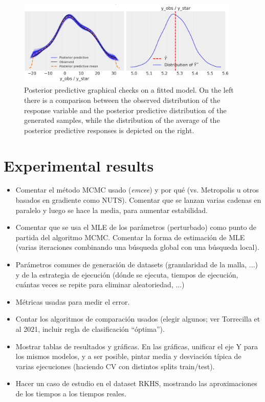 \documentclass[ba]{imsart}
\numberwithin{equation}{section}
\theoremstyle{plain}
\newenvironment{comment}[1][comment-red]
{
\noindent \color{#1}
}
{
\color{black}
}
\begin{document}
\begin{figure}[h]
  \centering
  \includegraphics[width=0.95\textwidth]{img/ppc_lin}
  \caption{Posterior predictive graphical checks on a fitted model. On the left there is a comparison between the observed distribution of the response variable and the posterior predictive distribution of the generated samples, while the distribution of the average of the posterior predictive responses is depicted on the right.}\label{fig:ppc}
\end{figure}

\section{Experimental results}\label{sec:results}
\begin{comment}
  \begin{itemize}
    \item Comentar el método MCMC usado (\textit{emcee}) y por qué (vs. Metropolis u otros basados en gradiente como NUTS). Comentar que se lanzan varias cadenas en paralelo y luego se hace la media, para aumentar estabilidad.
    \item Comentar que se usa el MLE de los parámetros (perturbado) como punto de partida del algoritmo MCMC. Comentar la forma de estimación de MLE (varias iteraciones combinando una búsqueda global con una búsqueda local).
    \item Parámetros comunes de generación de datasets (granularidad de la malla, ...) y de la estrategia de ejecución (dónde se ejecuta, tiempos de ejecución, cuántas veces se repite para eliminar aleatoriedad, ...)
    \item Métricas usadas para medir el error.
    \item Contar los algoritmos de comparación usados (elegir algunos; ver Torrecilla et al 2021, incluir regla de clasificación ``óptima'').
    \item Mostrar tablas de resultados y gráficas. En las gráficas, unificar el eje Y para los mismos modelos, y a ser posible, pintar media y desviación típica de varias ejecuciones (haciendo CV con distintos splits train/test).
    \item Hacer un caso de estudio en el dataset RKHS, mostrando las aproximaciones de los tiempos a los tiempos reales.
\end{itemize}
\end{comment}
\end{document}
